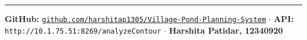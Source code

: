 \documentclass[12pt,a4paper]{article}
\begin{document}
\vspace{1cm}
\noindent\rule{\linewidth}{0.4pt}
\begin{center}
    \small
    \textbf{GitHub:}
    \href{https://github.com/harshitap1305/Village-Pond-Planning-System}{\texttt{github.com/harshitap1305/Village-Pond-Planning-System}}
    \quad$\cdot$\quad
    \textbf{API:} \texttt{http://10.1.75.51:8269/analyzeContour}
    \quad$\cdot$\quad
    \textbf{Harshita Patidar, 12340920}
\end{center}
\end{document}
